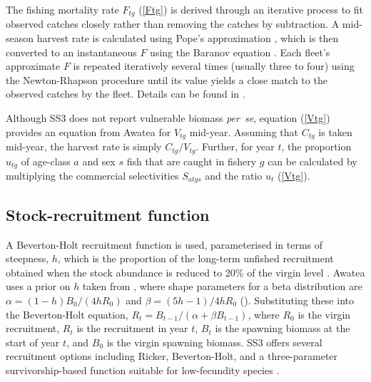 \documentclass[11pt]{book}
\newcommand{\pc}{\%}
\newcommand{\eref}[1]{(\ref{#1})}
\begin{document}
The fishing mortality rate $F_{tg}$ \eref{Ftg} is derived through an iterative process to fit observed catches closely rather than removing the catches by subtraction.
A mid-season harvest rate is calculated using Pope's approximation \citep{Pope:1972}, which is then converted to an instantaneous $F$ using the Baranov equation \citep{Baranov:1918}.
Each fleet's approximate $F$ is repeated iteratively several times (usually three to four) using the Newton-Rhapson procedure until its value yields a close match to the observed catches by the fleet.
Details can be found in \citet{Methot-Wetzel:2013}.

Although SS3 does not report vulnerable biomass \textit{per~se}, equation \eref{Vtg} provides an equation from Awatea for $V_{tg}$ mid-year.
Assuming that $C_{tg}$ is taken mid-year, the harvest rate is simply $C_{tg} / V_{tg}$.
Further, for year $t$, the proportion $u_{tg}$ of age-class $a$ and sex $s$ fish that are caught in fishery $g$ can be calculated by multiplying the commercial selectivities $S_{atgs}$ and the ratio $u_t$ \eref{Vtg}.

\subsection{Stock-recruitment function} \label{ss:stock-recruit}

A Beverton-Holt recruitment function is used, parameterised in terms of steepness, $h$, which is the proportion of the long-term unfished recruitment obtained when the stock abundance is reduced to 20\pc{} of the virgin level \citep{Mace-Doonan:1988, Michielsens-McAllister:2004}.
Awatea uses a prior on $h$ taken from \citet{Forrest-etal:2010}, where shape parameters for a beta distribution are $\alpha = (1 - h) B_0 / (4 h R_0)$ and $\beta = (5 h - 1) / 4 h R_0$ (\citealt{Hilborn-etal:2003, Michielsens-McAllister:2004}). 
Substituting these into the Beverton-Holt equation, $R_t = B_{t-1} / (\alpha + \beta B_{t-1})$, where $R_0$ is the virgin recruitment, $R_t$ is the recruitment in year $t$, $B_t$ is the spawning biomass at the start of year $t$, and $B_0$ is the virgin spawning biomass.
SS3 offers several recruitment options including Ricker, Beverton-Holt, and a three-parameter survivorship-based function suitable for low-fecundity species \citep{Taylor-etal:2013}.
\end{document}
